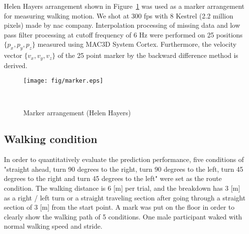 \documentclass{sigchi}
\begin{document}
Helen Hayers arrangement shown in Figure~\ref{fig:marker} was used as a marker arrangement for measuring walking motion. We shot at 300 fps with 8 Kestrel (2.2 million pixels) made by nac company. Interpolation processing of missing data and low pass filter processing at cutoff frequency of 6 Hz were performed on 25 positions $\{p_x, p_y, p_z \}$ measured using MAC3D System Cortex. Furthermore, the velocity vector $ \{v_x, v_y, v_z \} $ of the 25 point marker by the backward difference method is derived.

\begin{figure}
\centering
  \texttt{[image: fig/marker.eps]}
  \caption{Marker arrangement (Helen Hayers)}~ \label{fig:marker}
\end{figure}


\subsection{Walking condition}

In order to quantitatively evaluate the prediction performance, five conditions of "straight ahead, turn 90 degrees to the right, turn 90 degrees to the left, turn 45 degrees to the right and turn 45 degrees to the left" were set as the route condition. The walking distance is 6 [m] per trial, and the breakdown has 3 [m] as a right / left turn or a straight traveling section after going through a straight section of 3 [m] from the start point. A mark was put on the floor  in order to clearly show the walking path of 5 conditions. One male participant waked with normal walking speed and stride.
\end{document}

